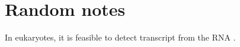 \section{Random notes}

In eukaryotes, it is feasible to detect transcript from the RNA \cite{Levsky2002}.


\FloatBarrier


